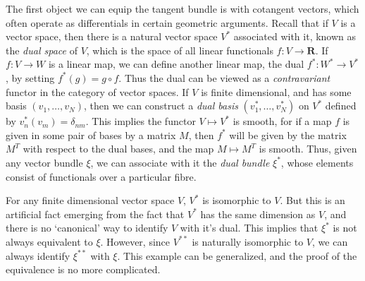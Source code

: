 The first object we can equip the tangent bundle is with cotangent vectors, which often operate as differentials in certain geometric arguments. Recall that if $V$ is a vector space, then there is a natural vector space $V^*$ associated with it, known as the {\it dual space} of $V$, which is the space of all linear functionals $f: V \to \mathbf{R}$. If $f: V \to W$ is a linear map, we can define another linear map, the dual $f^*: W^* \to V^*$, by setting $f^*(g) = g \circ f$. Thus the dual can be viewed as a {\it contravariant} functor in the category of vector spaces. If $V$ is finite dimensional, and has some basis $(v_1, \dots, v_N)$, then we can construct a {\it dual basis} $(v_1^*, \dots, v_N^*)$ on $V^*$ defined by $v_n^*(v_m) = \delta_{nm}$. This implies the functor $V \mapsto V^*$ is smooth, for if a map $f$ is given in some pair of bases by a matrix $M$, then $f^*$ will be given by the matrix $M^T$ with respect to the dual bases, and the map $M \mapsto M^T$ is smooth. Thus, given any vector bundle $\xi$, we can associate with it the {\it dual bundle} $\xi^*$, whose elements consist of functionals over a particular fibre.

For any finite dimensional vector space $V$, $V^*$ is isomorphic to $V$. But this is an artificial fact emerging from the fact that $V^*$ has the same dimension as $V$, and there is no `canonical' way to identify $V$ with it's dual. This implies that $\xi^*$ is not always equivalent to $\xi$. However, since $V^{**}$ is naturally isomorphic to $V$, we can always identify $\xi^{**}$ with $\xi$. This example can be generalized, and the proof of the equivalence is no more complicated.

